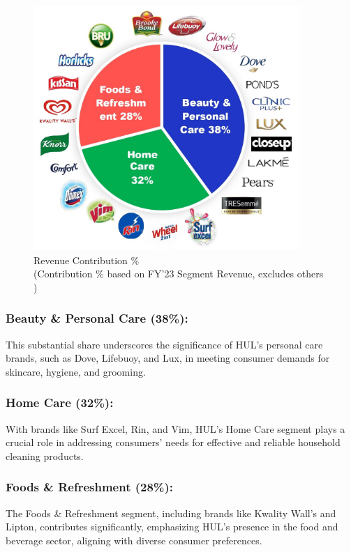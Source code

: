 \begin{figure}[h]
    \centering
    \includegraphics[width=0.9\textwidth]{images/Contri.jpg}
    \centering
    \caption{Revenue Contribution \% \\(Contribution \% based on FY’23 Segment Revenue, excludes others
    )}
    \label{fig:RevContri}
  \end{figure}
\subsubsection{Beauty \& Personal Care (38\%):}
This substantial share underscores the significance of HUL's personal care brands, such as Dove, Lifebuoy, and Lux, in meeting consumer demands for skincare, hygiene, and grooming.

\subsubsection{Home Care (32\%):}
With brands like Surf Excel, Rin, and Vim, HUL's Home Care segment plays a crucial role in addressing consumers' needs for effective and reliable household cleaning products.

\subsubsection{Foods \& Refreshment (28\%):}
The Foods \& Refreshment segment, including brands like Kwality Wall's and Lipton, contributes significantly, emphasizing HUL's presence in the food and beverage sector, aligning with diverse consumer preferences.


